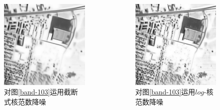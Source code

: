 \documentclass[10pt,aspectratio=43,mathserif]{beamer}
\begin{document}
\begin{frame}
\begin{columns}
\begin{figure}
\centering
\includegraphics[scale=0.2]{band-103-TNN.jpg}
\caption{对图\ref{band-103}运用截断式核范数降噪}
\end{figure}
\begin{figure}
\centering
\includegraphics[scale=0.2]{band-103-LNN.jpg}
\caption{对图\ref{band-103}运用$log$-核范数降噪}
\end{figure}

\end{columns}
\end{frame}
\end{document}

